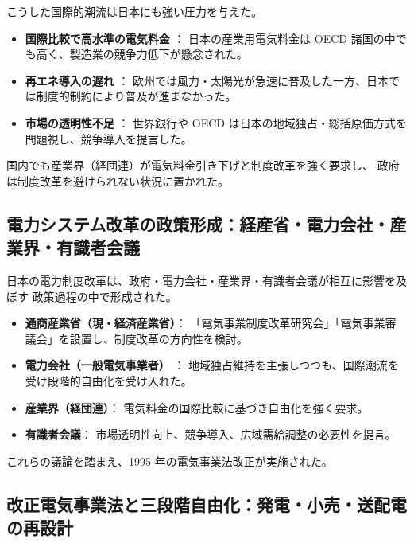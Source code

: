 こうした国際的潮流は日本にも強い圧力を与えた。

\begin{itemize}
  \item \textbf{国際比較で高水準の電気料金} ： 
        日本の産業用電気料金は OECD 諸国の中でも高く、製造業の競争力低下が懸念された。
  \item \textbf{再エネ導入の遅れ}  ：
        欧州では風力・太陽光が急速に普及した一方、日本では制度的制約により普及が進まなかった。
  \item \textbf{市場の透明性不足} ： 
        世界銀行や OECD は日本の地域独占・総括原価方式を問題視し、競争導入を提言した。
\end{itemize}

国内でも産業界（経団連）が電気料金引き下げと制度改革を強く要求し、
政府は制度改革を避けられない状況に置かれた。


\subsection{電力システム改革の政策形成：経産省・電力会社・産業界・有識者会議}

日本の電力制度改革は、政府・電力会社・産業界・有識者会議が相互に影響を及ぼす
政策過程の中で形成された。

\begin{itemize}
  \item \textbf{通商産業省（現・経済産業省）}：  
        「電気事業制度改革研究会」「電気事業審議会」を設置し、制度改革の方向性を検討。
  \item \textbf{電力会社（一般電気事業者）} ：
        地域独占維持を主張しつつも、国際潮流を受け段階的自由化を受け入れた。
  \item \textbf{産業界（経団連）}： 
        電気料金の国際比較に基づき自由化を強く要求。
  \item \textbf{有識者会議}：
        市場透明性向上、競争導入、広域需給調整の必要性を提言。
\end{itemize}

これらの議論を踏まえ、1995 年の電気事業法改正が実施された。


\subsection{改正電気事業法と三段階自由化：発電・小売・送配電の再設計}

